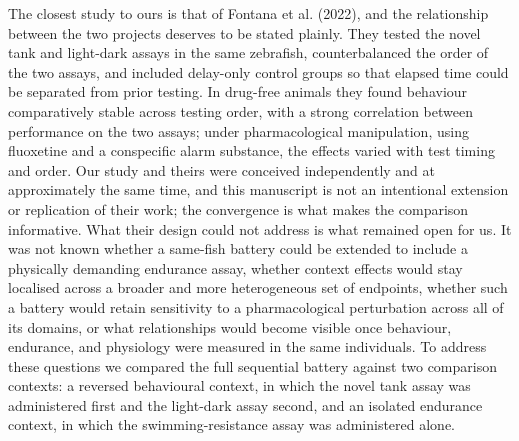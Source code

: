 \documentclass[12pt,a4paper]{article}
\begin{document}
The closest study to ours is that of Fontana et al. (2022), and the relationship between the two projects deserves to be stated plainly. They tested the novel tank and light-dark assays in the same zebrafish, counterbalanced the order of the two assays, and included delay-only control groups so that elapsed time could be separated from prior testing. In drug-free animals they found behaviour comparatively stable across testing order, with a strong correlation between performance on the two assays; under pharmacological manipulation, using fluoxetine and a conspecific alarm substance, the effects varied with test timing and order. Our study and theirs were conceived independently and at approximately the same time, and this manuscript is not an intentional extension or replication of their work; the convergence is what makes the comparison informative. What their design could not address is what remained open for us. It was not known whether a same-fish battery could be extended to include a physically demanding endurance assay, whether context effects would stay localised across a broader and more heterogeneous set of endpoints, whether such a battery would retain sensitivity to a pharmacological perturbation across all of its domains, or what relationships would become visible once behaviour, endurance, and physiology were measured in the same individuals. To address these questions we compared the full sequential battery against two comparison contexts: a reversed behavioural context, in which the novel tank assay was administered first and the light-dark assay second, and an isolated endurance context, in which the swimming-resistance assay was administered alone.
\end{document}
